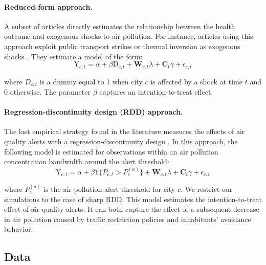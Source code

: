 \documentclass[12pt]{article}
\begin{document}
        \paragraph{Reduced-form approach.} A subset of articles directly estimates the relationship between the health outcome and exogenous shocks to air pollution. For instance, articles using this approach exploit public transport strikes or thermal inversion as exogenous shocks \citep{bauernschuster_when_2017, jans_economic_2018, godzinski2019short, giaccherini_when_2021}. They estimate a model of the form:
        ~
        \begin{equation}
        \text{Y}_{c,t} = \alpha + \beta\text{D}_{c,t} + \textbf{W}_{c,t}\lambda + \textbf{C}_{t}\gamma + \epsilon_{c,t}
        \end{equation}
        
        \noindent where $D_{c,t}$ is a dummy equal to 1 when city $c$ is affected by a shock at time $t$ and 0 otherwise. The parameter $\beta$ captures an intention-to-treat effect.

        \begin{sloppypar}
        \paragraph{Regression-discontinuity design (RDD) approach.} The last empirical strategy found in the literature measures the effects of air quality alerts with a regression-discontinuity design \citep{chen_effect_2018, anderson2022bounds}. In this approach, the following model is estimated for observations within an air pollution concentration bandwidth around the alert threshold:
        ~
        \begin{equation}
        \text{Y}_{c,t} = \alpha + \beta \textbf{1}\{P_{c,t} > P^{(a)}_{c}\} + \textbf{W}_{c,t}\lambda + \textbf{C}_{t}\gamma + \epsilon_{c,t}
        \end{equation}
        \end{sloppypar}
        
        \noindent where $P^{(a)}_{c}$ is the air pollution alert threshold for city $c$. We restrict our simulations to the case of sharp RDD. This model estimates the intention-to-treat effect of air quality alerts.  It can both capture the effect of a subsequent decrease in air pollution caused by traffic restriction policies and inhabitants' avoidance behavior. 
        
        \subsection{Data}
        
\end{document}
